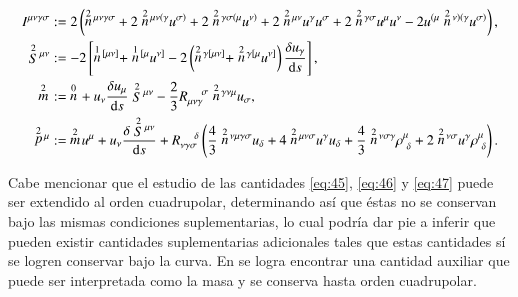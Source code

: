 \begin{align}
I^{\mu \nu \gamma \sigma} &:= 2\left( \des{2}{n}^{\mu \nu \gamma \sigma} + 2 \des{2}{n}^{\mu \nu (\gamma} u^{\sigma)} + 2\des{2}{n}^{\gamma \sigma (\mu} u^{\nu)} + 2\des{2}{n}^{\mu \nu} u^{\gamma} u^{\sigma} + 2\des{2}{n}^{\gamma \sigma} u^{\mu} u^{\nu} - 2 u^{(\mu} \des{2}{n}^{\nu)(\gamma} u^{\sigma)} \right),\\
\des{2}{S}^{\mu \nu} &:= -2 \left[ \des{1}{n}^{[\mu \nu]} + \des{1}{n}^{[\mu} u^{\nu]} - 2\left( \des{2}{n}^{\gamma [\mu \nu]} + \des{2}{n}^{\gamma [\mu} u^{\nu]} \right) \cd{u_{\gamma}} \right],\\
\des{2}{m} &:= \ \des{0}{n} + u_{\nu} \cd{u_{\mu}} \des{2}{S}^{\mu \nu} - \frac{2}{3} R_{\mu \nu \gamma}^{\ \ \ \ \sigma} \des{2}{n}^{\gamma \nu \mu} u_{\sigma},\\
\des{2}{p}^{\mu} &:= \ \des{2}{m} u^{\mu} + u_{\nu} \cd{\des{2}{S}^{\mu \nu}} + R_{\nu \gamma \sigma}^{\ \ \ \ \delta} \left( \frac{4}{3}\des{2}{n}^{\nu \mu \gamma \sigma} u_{\delta} + 4\des{2}{n}^{\mu \nu \sigma} u^{\gamma} u_{\delta} + \frac{4}{3} \des{2}{n}^{\nu \sigma \gamma} \rho^{\mu}_{\ \delta} + 2 \des{2}{n}^{\nu \sigma} u^{\gamma} \rho^{\mu}_{\ \delta} \right).
\end{align}

Cabe mencionar que el estudio de las cantidades \eqref{eq:45}, \eqref{eq:46} y \eqref{eq:47} puede ser extendido al orden cuadrupolar, determinando así que éstas no se conservan bajo las mismas condiciones suplementarias, lo cual podría dar pie a inferir que pueden existir cantidades suplementarias adicionales tales que estas cantidades sí se logren conservar bajo la curva. En \cite{Steinhoff-Puetzfeld-2} se logra encontrar una cantidad auxiliar que puede ser interpretada como la masa y se conserva hasta orden cuadrupolar.